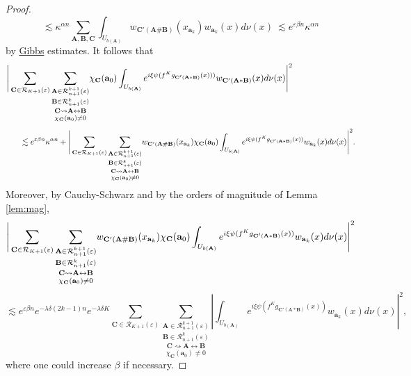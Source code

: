 \documentclass[a4paper]{article}
\theoremstyle{definition}
\begin{document}
\begin{proof}
$$ \lesssim \kappa^{\alpha n}  \sum_{\mathbf{A},\mathbf{B},\mathbf{C}}\int_{U_{b(\mathbf{A})}}  w_{\mathbf{C}'(\mathbf{A} \# \mathbf{B})}(x_{\mathbf{a}_k}) w_{\mathbf{a}_k}(x) d\nu(x) \ \lesssim e^{\varepsilon \beta n} \kappa^{\alpha n} $$
by \hyperref[Gibbs]{Gibbs} estimates. It follows that $$ \Bigg{|} \sum_{\mathbf{C} \in \mathcal{R}_{K+1}(\varepsilon)} \underset{\chi_{\mathbf{C}}(\mathbf{a}_0) \neq 0}{\underset{\mathbf{C} \rightsquigarrow \mathbf{A} \leftrightarrow \mathbf{B}}{ \underset{ \mathbf{B} \in \mathcal{R}_{n+1}^k(\varepsilon)}{ \underset{\mathbf{A} \in \mathcal{R}_{n+1}^{k+1}(\varepsilon) }{ \sum}} }} \chi_{\mathbf{C}}(\mathbf{a}_0) \int_{U_{b(\mathbf{A})}} e^{i \xi \psi( f^K g_{\mathbf{C}'(\mathbf{A} * \mathbf{B})}(x)))} w_{\mathbf{C}'(\mathbf{A} * \mathbf{B})}(x) d\nu(x) \Bigg{|}^2 \quad \quad \quad \quad \quad \quad \quad  $$
$$ \quad \quad \lesssim  e^{\varepsilon \beta n} 
\kappa^{\alpha n} +  \Bigg{|}  \sum_{\mathbf{C} \in \mathcal{R}_{K+1}(\varepsilon)} \underset{\chi_{\mathbf{C}}(\mathbf{a}_0) \neq 0}{\underset{\mathbf{C} \rightsquigarrow \mathbf{A} \leftrightarrow \mathbf{B}}{ \underset{ \mathbf{B} \in \mathcal{R}_{n+1}^k(\varepsilon)}{ \underset{\mathbf{A} \in \mathcal{R}_{n+1}^{k+1}(\varepsilon) }{ \sum}} }} w_{\mathbf{C}'(\mathbf{A} \# \mathbf{B})}(x_{\mathbf{a}_k})  \chi_{\mathbf{C}}(\mathbf{a}_0) \int_{U_{b(\mathbf{A})}} e^{i \xi \psi(f^K g_{\mathbf{C}'(\mathbf{A} * \mathbf{B})}(x) ) }   w_{\mathbf{a}_k}(x) d\nu(x) \Bigg{|}^2 . $$
Moreover, by Cauchy-Schwarz and by the orders of magnitude of Lemma \ref{lem:mag},
$$ \Bigg{|}  \sum_{\mathbf{C} \in \mathcal{R}_{K+1}(\varepsilon)} \underset{\chi_{\mathbf{C}}(\mathbf{a}_0) \neq 0}{\underset{\mathbf{C} \rightsquigarrow \mathbf{A} \leftrightarrow \mathbf{B}}{ \underset{ \mathbf{B} \in \mathcal{R}_{n+1}^k(\varepsilon)}{ \underset{\mathbf{A} \in \mathcal{R}_{n+1}^{k+1}(\varepsilon) }{ \sum}} }} w_{\mathbf{C}'(\mathbf{A} \# \mathbf{B})}(x_{\mathbf{a}_k})  \chi_{\mathbf{C}}(\mathbf{a}_0) \int_{U_{b(\mathbf{A})}} e^{i \xi \psi(f^K g_{\mathbf{C}'(\mathbf{A} * \mathbf{B})}(x) ) }   w_{\mathbf{a}_k}(x) d\nu(x) \Bigg{|}^2   $$
$$  \lesssim e^{\varepsilon \beta n} e^{-\lambda \delta (2k-1) n} e^{- \lambda \delta K} \sum_{\mathbf{C} \in \mathcal{R}_{K+1}(\varepsilon)} \underset{\chi_{\mathbf{C}}(\mathbf{a}_0) \neq 0}{\underset{\mathbf{C} \rightsquigarrow \mathbf{A} \leftrightarrow \mathbf{B}}{ \underset{ \mathbf{B} \in \mathcal{R}_{n+1}^k(\varepsilon)}{ \underset{\mathbf{A} \in \mathcal{R}_{n+1}^{k+1}(\varepsilon) }{ \sum}} }}\left| \int_{U_{b(\mathbf{A})}} e^{i \xi \psi(f^K g_{\mathbf{C}' (\mathbf{A} * \mathbf{B})}(x) ) }   w_{\mathbf{a}_k}(x) d\nu(x) \right|^2 ,$$
where one could increase $\beta$ if necessary.\end{proof}
\end{document}
